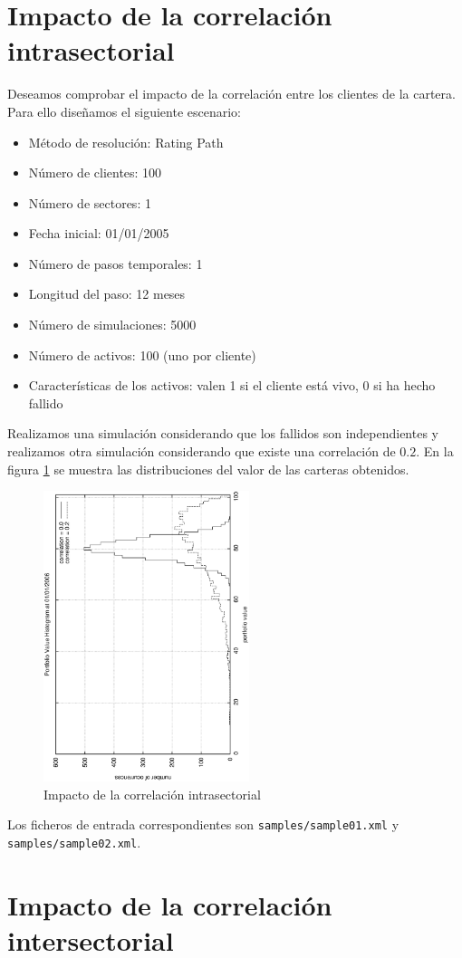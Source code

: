 \section{Impacto de la correlaci\'on intrasectorial}

Deseamos comprobar el impacto de la correlaci\'on entre los clientes de la 
cartera. Para ello dise\~namos el siguiente escenario:

\begin{itemize}
\item M\'etodo de resoluci\'on: Rating Path
\item N\'umero de clientes: 100
\item N\'umero de sectores: 1
\item Fecha inicial: 01/01/2005
\item N\'umero de pasos temporales: 1
\item Longitud del paso: 12 meses
\item N\'umero de simulaciones: 5000
\item N\'umero de activos: 100 (uno por cliente)
\item Caracter\'isticas de los activos: valen 1 si el cliente est\'a vivo, 0 si 
ha hecho fallido
\end{itemize}

Realizamos una simulaci\'on considerando que los fallidos son independientes y 
realizamos otra simulaci\'on considerando que existe una correlaci\'on de
$0.2$. En la figura \ref{sectorcorrel} se muestra las distribuciones del 
valor de las carteras obtenidos.

\begin{figure}[!hb]
\begin{center}
\includegraphics[width=6cm,angle=-90]{./samples/sectorcorrel.ps}
\caption{Impacto de la correlaci\'on intrasectorial}
\label{sectorcorrel}
\end{center}
\end{figure}

Los ficheros de entrada correspondientes son \verb+samples/sample01.xml+ y 
\verb+samples/sample02.xml+.

\section{Impacto de la correlaci\'on intersectorial}

